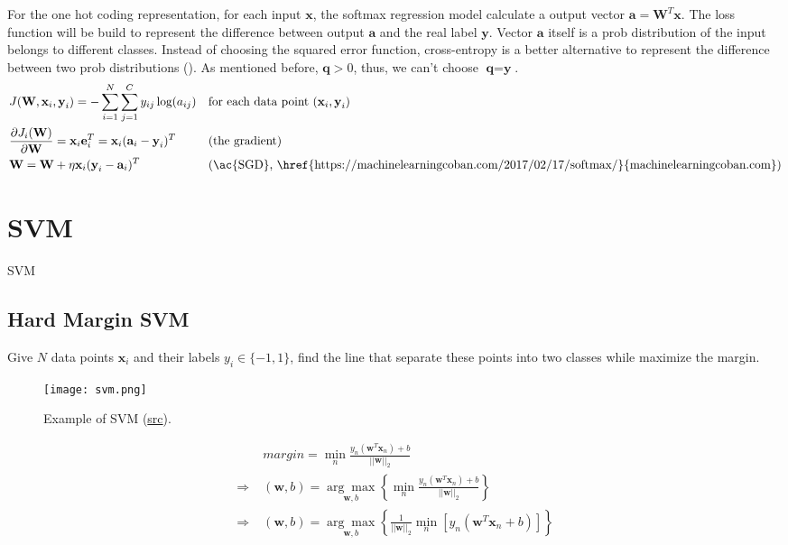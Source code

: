 For the one hot coding representation, for each input $\textbf{x}$, the softmax regression model calculate a output vector $\textbf{a} = \textbf{W}^T \textbf{x}$. The loss function will be build to represent the difference between output $\textbf{a}$ and the real label $\textbf{y}$. Vector $\textbf{a}$ itself is a \ac{prob} distribution of the input belongs to different classes. Instead of choosing the squared error function, cross-entropy is a better alternative to represent the difference between two \ac{prob} distributions (). As mentioned before, $\textbf{q} >0$, thus, we can't choose $\textbf{q} = \textbf{y}$.
\begin{align}
	&J(\textbf{W},\textbf{x}_i,\textbf{y}_i) = - \sum_{i=1}^{N} \sum_{j=1}^{C} y_{ij}\,\text{log}(a_{ij}) && \text{for each data point } (\textbf{x}_i, \textbf{y}_i) \\
	&\frac{\partial J_i(\textbf{W})}{\partial \textbf{W}} = \textbf{x}_i \textbf{e}_i^T = \textbf{x}_i (\textbf{a}_{i} - \textbf{y}_{i})^T && \text{(the gradient)}\\
	&\textbf{W} = \textbf{W} + \eta \textbf{x}_i (\textbf{y}_i - \textbf{a}_i)^T && \text{(\ac{SGD}, \href{https://machinelearningcoban.com/2017/02/17/softmax/}{machinelearningcoban.com})}
\end{align}

\section{SVM}

\ac{SVM}

\subsection{Hard Margin \ac{SVM}}

 Give $N$ data points $\textbf{x}_i$ and their labels $y_i \in \{-1, 1\}$, find the line that separate these points into two classes while maximize the margin.

\begin{figure}[hbt!]
	\centering
	\texttt{[image: svm.png]}
	\caption{Example of \ac{SVM} (\href{https://en.wikipedia.org/wiki/Support-vector_machine}{src}).}
\end{figure}

\begin{align}
	&margin = \underset{n}{\min} \frac{y_n (\textbf{w}^T \textbf{x}_n) +b}{||\textbf{w}||_2}\\
	\Rightarrow\; &(\textbf{w},b) = \underset{\textbf{w}, b}{\arg\max} \left\{ \underset{n}{\min} \frac{y_n (\textbf{w}^T \textbf{x}_n) +b}{||\textbf{w}||_2} \right\} \\
	\Rightarrow\; &(\textbf{w},b) = \underset{\textbf{w}, b}{\arg\max} \left\{ \frac{1}{||\textbf{w}||_2} \underset{n}{\min}\left[ y_n(\textbf{w}^T \textbf{x}_n+b) \right] \right\}
\end{align}

